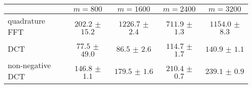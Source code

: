 \centering
\renewcommand{\arraystretch}{1.2}
\begin{tabular}{@{}lcccc@{}}
\toprule
 & $m=800$ & $m=1600$ & $m=2400$ & $m=3200$\\
\midrule
quadrature FFT & $202.2$ $\pm$ $15.2$ & $1226.7$ $\pm$ $2.4$ & $711.9$ $\pm$ $1.3$ & $1154.0$ $\pm$ $8.3$ \\
DCT & $77.5$ $\pm$ $49.0$ & $86.5$ $\pm$ $2.6$ & $114.7$ $\pm$ $1.7$ & $140.9$ $\pm$ $1.1$ \\
non-negative DCT & $146.8$ $\pm$ $1.1$ & $179.5$ $\pm$ $1.6$ & $210.4$ $\pm$ $0.7$ & $239.1$ $\pm$ $0.9$ \\
\bottomrule
\end{tabular}
